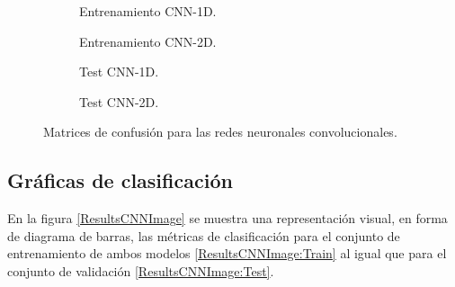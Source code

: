     \begin{figure}[H]
      \centering
      \begin{subfigure}{0.4\textwidth}
          
          \caption{Entrenamiento CNN-1D.}
          \label{ConfusionMatrixCNNImages:Train1D}
      \end{subfigure}
      \hspace{1mm}
      \begin{subfigure}{0.4\textwidth}
          
          \caption{Entrenamiento CNN-2D.} 
          \label{ConfusionMatrixCNNImages:Train2D}
      \end{subfigure}
      \vspace*{2mm}
      \begin{subfigure}{0.4\textwidth}
          
          \caption{Test CNN-1D.}
          \label{ConfusionMatrixCNNImages:Test1D}
      \end{subfigure}
      \hspace{1em}
      \begin{subfigure}{0.4\textwidth}
          
          \caption{Test CNN-2D.} 
          \label{ConfusionMatrixCNNImages:Test2D}
      \end{subfigure}
      \caption{Matrices de confusión para las redes neuronales convolucionales.}
      \label{ConfusionMatrixCNNImages}
    \end{figure}

  \subsection{Gráficas de clasificación}

    En la figura \eqref{ResultsCNNImage} se muestra una representación visual, en forma de diagrama de barras, las métricas de clasificación para el conjunto de entrenamiento de ambos modelos \eqref{ResultsCNNImage:Train} al igual que para el conjunto de validación \eqref{ResultsCNNImage:Test}.

